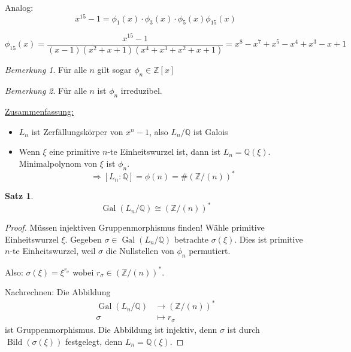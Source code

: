 \documentclass[a4paper,12pt,numbers=noenddot,parskip=full]{scrartcl}
\newcommand{\setZ}{\mathbb{Z}}
\newcommand{\setQ}{\mathbb{Q}}
\newcommand{\heading}{\underline}
\DeclareMathOperator{\Gal}{Gal}
\theoremstyle{dotless}
\newtheorem{theorem}{Satz}[section]
\theoremstyle{remark}
\newtheorem*{remark}{Bemerkung}
\begin{document}
	Analog:
	\begin{equation*}
		x^{15} - 1 = \phi_1(x) \cdot \phi_3(x) \cdot \phi_5(x) \phi_{15}(x)
	\end{equation*}
	
	\begin{equation*}
		\phi_{15}(x) = \frac{x^{15} - 1}{(x-1)(x^2 + x + 1)(x^4 + x^3 + x^2 + x + 1)} = x^8 - x^7 + x^5 - x^4 + x^3 - x + 1
	\end{equation*}
	
	\begin{remark}
		Für alle $n$ gilt sogar $\phi_n \in \setZ[x]$
	\end{remark}

	\begin{remark}
		Für alle $n$ ist $\phi_n$ irreduzibel.
	\end{remark}

	\heading{Zusammenfassung:}
	\begin{itemize}
		\item $L_n$ ist Zerfällungskörper von $x^n - 1$, also $L_n/\setQ$ ist Galois
		\item Wenn $\xi$ eine primitive $n$-te Einheitswurzel ist, dann ist $L_n = \setQ(\xi)$. Minimalpolynom von $\xi$ ist $\phi_n$.
		\begin{equation*}
			\Rightarrow [L_n: \setQ] = \phi(n) = \# (\setZ/(n))^*
		\end{equation*}
	\end{itemize}

	\begin{theorem}
		\begin{equation*}
			\Gal(L_n/\setQ) \cong (\setZ/(n))^*
		\end{equation*}
	\end{theorem}

	\begin{proof}
		Müssen injektiven Gruppenmorphismus finden! Wähle primitive Einheitswurzel $\xi$. Gegeben $\sigma \in \Gal(L_n/\setQ)$ betrachte $\sigma(\xi)$. Dies ist primitive $n$-te Einheitswurzel, weil $\sigma$ die Nullstellen von $\phi_n$ permutiert.
		
		Also: $\sigma(\xi) = \xi^{r_\sigma}$ wobei $r_\sigma \in (\setZ/(n))^*$.
		
		Nachrechnen: Die Abbildung
		\begin{align*}
			\Gal(L_n/\setQ) &\longrightarrow (\setZ/(n))^* \\
			\sigma &\longmapsto r_\sigma
		\end{align*}
		ist Gruppenmorphismus. Die Abbildung ist injektiv, denn $\sigma$ ist durch $\operatorname{Bild}(\sigma(\xi))$ festgelegt, denn $L_n = \setQ(\xi)$.
	\end{proof}
\end{document}
